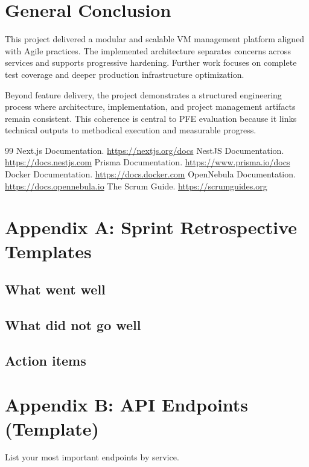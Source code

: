 \documentclass[12pt,a4paper]{report}
\begin{document}
\chapter{General Conclusion}
This project delivered a modular and scalable VM management platform aligned with Agile practices.
The implemented architecture separates concerns across services and supports progressive hardening.
Further work focuses on complete test coverage and deeper production infrastructure optimization.

Beyond feature delivery, the project demonstrates a structured engineering process where architecture, implementation, and project management artifacts remain consistent.
This coherence is central to PFE evaluation because it links technical outputs to methodical execution and measurable progress.

\begin{thebibliography}{99}
 Next.js Documentation. \url{https://nextjs.org/docs}
 NestJS Documentation. \url{https://docs.nestjs.com}
 Prisma Documentation. \url{https://www.prisma.io/docs}
 Docker Documentation. \url{https://docs.docker.com}
 OpenNebula Documentation. \url{https://docs.opennebula.io}
 The Scrum Guide. \url{https://scrumguides.org}
\end{thebibliography}

\appendix
\chapter{Appendix A: Sprint Retrospective Templates}
\section*{What went well}
\section*{What did not go well}
\section*{Action items}

\chapter{Appendix B: API Endpoints (Template)}
List your most important endpoints by service.
\end{document}
